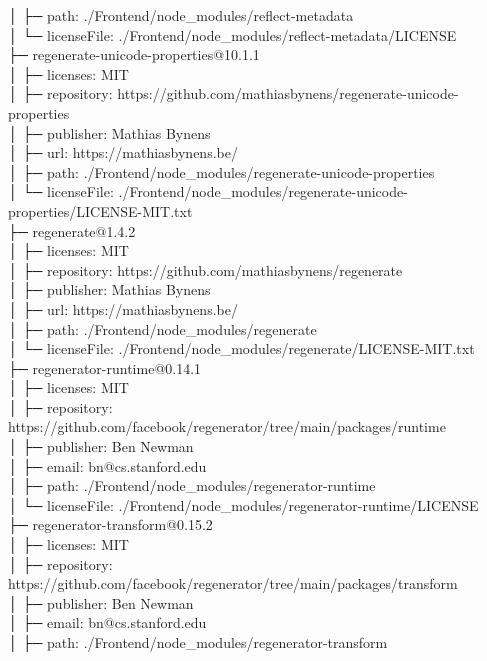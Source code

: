 \documentclass[
    paper=a4,
    twoside=false,
    parskip=half,
    listof=entryprefix,
    listof=totoc,
    index=totoc,
    bibliography=totoc,
    headsepline,
]{scrbook}
\begin{document}
    │  ├─ path: ./Frontend/node\_modules/reflect-metadata\\
    │  └─ licenseFile: ./Frontend/node\_modules/reflect-metadata/LICENSE\\
    ├─ regenerate-unicode-properties@10.1.1\\
    │  ├─ licenses: MIT\\
    │  ├─ repository: https://github.com/mathiasbynens/regenerate-unicode-properties\\
    │  ├─ publisher: Mathias Bynens\\
    │  ├─ url: https://mathiasbynens.be/\\
    │  ├─ path: ./Frontend/node\_modules/regenerate-unicode-properties\\
    │  └─ licenseFile: ./Frontend/node\_modules/regenerate-unicode-properties/LICENSE-MIT.txt\\
    ├─ regenerate@1.4.2\\
    │  ├─ licenses: MIT\\
    │  ├─ repository: https://github.com/mathiasbynens/regenerate\\
    │  ├─ publisher: Mathias Bynens\\
    │  ├─ url: https://mathiasbynens.be/\\
    │  ├─ path: ./Frontend/node\_modules/regenerate\\
    │  └─ licenseFile: ./Frontend/node\_modules/regenerate/LICENSE-MIT.txt\\
    ├─ regenerator-runtime@0.14.1\\
    │  ├─ licenses: MIT\\
    │  ├─ repository: https://github.com/facebook/regenerator/tree/main/packages/runtime\\
    │  ├─ publisher: Ben Newman\\
    │  ├─ email: bn@cs.stanford.edu\\
    │  ├─ path: ./Frontend/node\_modules/regenerator-runtime\\
    │  └─ licenseFile: ./Frontend/node\_modules/regenerator-runtime/LICENSE\\
    ├─ regenerator-transform@0.15.2\\
    │  ├─ licenses: MIT\\
    │  ├─ repository: https://github.com/facebook/regenerator/tree/main/packages/transform\\
    │  ├─ publisher: Ben Newman\\
    │  ├─ email: bn@cs.stanford.edu\\
    │  ├─ path: ./Frontend/node\_modules/regenerator-transform\\
\end{document}
